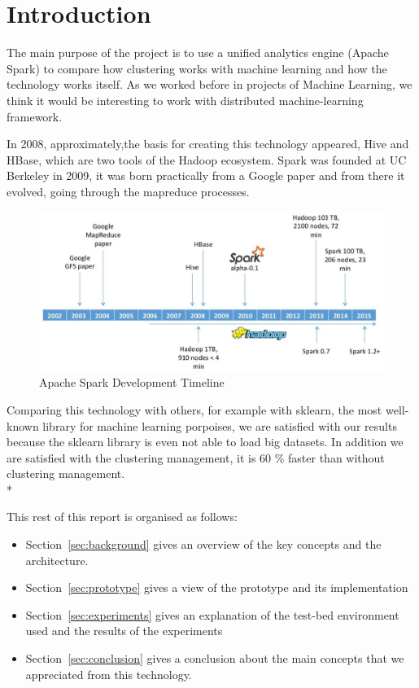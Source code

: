 \section{Introduction}
\label{sec:introduction}

The main purpose of the project is to use a unified analytics engine (Apache Spark) to compare how clustering works with machine learning and how the technology works itself. As we worked before in projects of Machine Learning, we think it would be interesting to work with distributed machine-learning framework.


In 2008, approximately,the basis for creating this technology appeared, Hive and HBase, which are two tools of the Hadoop ecosystem.  
Spark was founded at UC Berkeley in 2009, it was born practically from a Google paper and from there it evolved, going through the mapreduce processes.



\noindent
\begin{figure}[h]
	\centering
	\includegraphics[scale=0.3]{figs/TimelineSpark.jpg}
	\caption{Apache Spark Development Timeline}
	\label{fig:timeline}
\end{figure}

Comparing this technology with others, for example with sklearn, the most well-known library for machine learning porpoises, we are satisfied with our results because the sklearn library is even not able to load big datasets. In addition we are satisfied with the clustering management, it is 60 \% faster than without clustering management. \\*

\noindent

This rest of this report is organised as follows:

\begin{itemize}


\item Section~\ref{sec:background} gives an overview of the key concepts and the architecture.

\item Section~\ref{sec:prototype} gives a view of the prototype and its implementation

\item Section~\ref{sec:experiments} gives an explanation of the test-bed environment used and the results of the experiments

\item Section~\ref{sec:conclusion} gives a conclusion about the main concepts that we appreciated from this technology.

\end{itemize}
\noindent